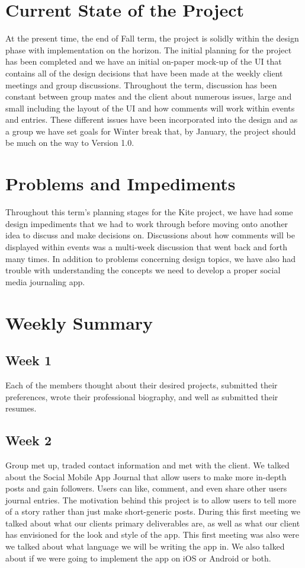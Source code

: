 \documentclass[compsoc, 10, draftclsnofoot, onecolumn]{IEEEtran}
\begin{document}
\section{Current State of the Project}
At the present time, the end of Fall term, the project is solidly within the design phase with implementation on the horizon. The initial planning for the project has been completed and we have an initial on-paper mock-up of the UI that contains all of the design decisions that have been made at the weekly client meetings and group discussions. Throughout the term, discussion has been constant between group mates and the client about numerous issues, large and small including the layout of the UI and how comments will work within events and entries. These different issues have been incorporated into the design and as a group we have set goals for Winter break that, by January, the project should be much on the way to Version 1.0. 

\section{Problems and Impediments}
Throughout this term's planning stages for the Kite project, we have had some design impediments that we had to work through before moving onto another idea to discuss and make decisions on. Discussions about how comments will be displayed within events was a multi-week discussion that went back and forth many times. In addition to problems concerning design topics, we have also had trouble with understanding the concepts we need to develop a proper social media journaling app. 

\section{Weekly Summary}
\subsection{Week 1} Each of the members thought about their desired projects, submitted their preferences, wrote their professional biography, and well as submitted their resumes. 

\subsection{Week 2} Group met up, traded contact information and met with the client. We talked about the Social Mobile App Journal that allow users to make more in-depth posts and gain followers. Users can like, comment, and even share other users journal entries. The motivation behind this project is to allow users to tell more of a story rather than just make short-generic posts. During this first meeting we talked about what our clients primary deliverables are, as well as what our client has envisioned for the look and style of the app. This first meeting was also were we talked about what language we will be writing the app in. We also talked about if we were going to implement the app on iOS or Android or both.  
\end{document}
